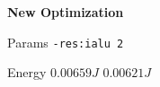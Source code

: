 
        \begin{tcolorbox}[width=\linewidth, colback=white!95!black, colframe=white!95!black]
            \begin{center}\textbf{New Optimization}\end{center}

            \tcblower
            
            Params \hfill \verb|-res:ialu 2|

            Energy \hfill \st{$0.00659J$} $0.00621J$

        \end{tcolorbox}
    